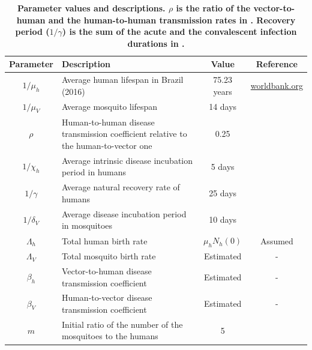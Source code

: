 \documentclass[10pt,letterpaper]{article}
\begin{document}
\begin{table}[!ht]
    \begin{adjustwidth}{-2.25in}{0in} %
    \centering
    \caption{\textbf{Parameter values and descriptions. $\rho$ is the ratio of the vector-to-human and the human-to-human transmission rates in \cite{gao2016prevention}. Recovery period ($1/\gamma$) is the sum of the acute and the convalescent infection durations in \cite{gao2016prevention}.} }
    \begin{tabular}{cp{3in}cc}\hline
      Parameter   & Description & Value & Reference \\ \hline
       $1/\mu_h$  & Average human lifespan in Brazil (2016) &75.23 years& \url{worldbank.org}\\ 
       $1/\mu_V$ & Average mosquito lifespan & 14 days&\cite{gao2016prevention}\\
       $\rho$ & Human-to-human disease transmission coefficient relative to the human-to-vector one & 0.25 &\cite{gao2016prevention}\\
       $1/\chi_h$ & Average intrinsic disease incubation period in humans &5 days&\cite{gao2016prevention}\\
       $1/\gamma$ & Average natural recovery rate of humans &25 days&\cite{gao2016prevention}\\
       $1/\delta_V$ & Average disease incubation period in mosquitoes & 10 days & \cite{gao2016prevention}\\
       $\Lambda_h$ & Total human birth rate & $\mu_hN_h(0)$&Assumed\\
       $\Lambda_V$ & Total mosquito birth rate & Estimated &-\\
       $\beta_h$ & Vector-to-human disease transmission coefficient & Estimated &-\\
       $\beta_V$ & Human-to-vector disease transmission coefficient & Estimated & -\\
       $m$ & Initial ratio of the number of the mosquitoes to the humans & 5 & \cite{gao2016prevention}\\
       \hline
       
    \end{tabular}
    
    \label{tab:zika_params}
    \end{adjustwidth}
\end{table}
\end{document}
